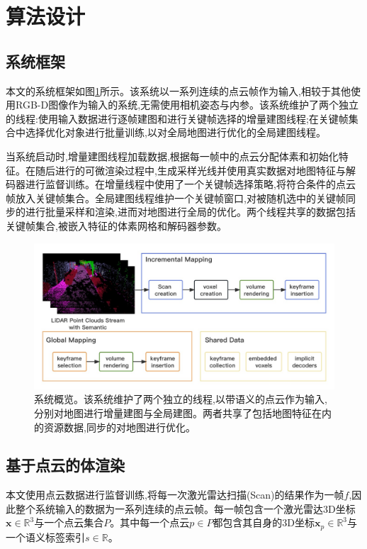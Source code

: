 \section{算法设计}\label{algorithm}
\subsection{系统框架}
本文的系统框架如图\ref{system}所示。该系统以一系列连续的点云帧作为输入,相较于其他使用RGB-D图像作为输入的系统,无需使用相机姿态与内参。该系统维护了两个独立的线程:使用输入数据进行逐帧建图和进行关键帧选择的增量建图线程;在关键帧集合中选择优化对象进行批量训练,以对全局地图进行优化的全局建图线程。

当系统启动时,增量建图线程加载数据,根据每一帧中的点云分配体素和初始化特征。在随后进行的可微渲染过程中,生成采样光线并使用真实数据对地图特征与解码器进行监督训练。在增量线程中使用了一个关键帧选择策略,将符合条件的点云帧放入关键帧集合。全局建图线程维护一个关键帧窗口,对被随机选中的关键帧同步的进行批量采样和渲染,进而对地图进行全局的优化。两个线程共享的数据包括关键帧集合,被嵌入特征的体素网格和解码器参数。
\begin{figure}[htbp]
    \includegraphics[scale = 0.355]{figures/system.jpg}
    \centering
    \caption{系统概览。该系统维护了两个独立的线程,以带语义的点云作为输入,分别对地图进行增量建图与全局建图。两者共享了包括地图特征在内的资源数据,同步的对地图进行优化。}\label{system}
\end{figure}
\subsection{基于点云的体渲染}
本文使用点云数据进行监督训练,将每一次激光雷达扫描(Scan)的结果作为一帧$f$,因此整个系统输入的数据为一系列连续的点云帧。每一帧包含一个激光雷达3D坐标$\mathbf{x}\in \mathbb{R}^3 $与一个点云集合$P$。其中每一个点云$p\in P$都包含其自身的3D坐标$\mathbf{x}_p\in \mathbb{R}^3$与一个语义标签索引$s\in \mathbb{R}$。
